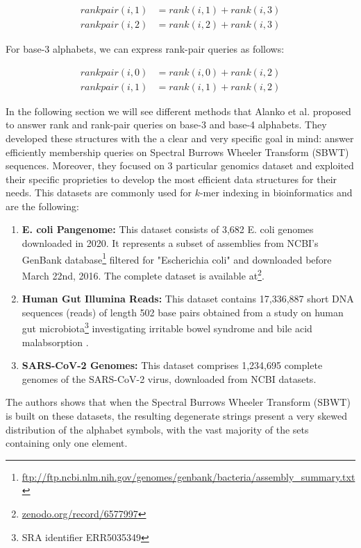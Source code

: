 \begin{align}
    rankpair(i,1) & = rank(i,1) + rank(i,3) \\
    rankpair(i,2) & = rank(i,2) + rank(i,3)
\end{align}

\noindent For base-3 alphabets, we can express rank-pair queries as follows:

\begin{align}
    rankpair(i,0) & = rank(i,0) + rank(i,2) \\
    rankpair(i,1) & = rank(i,1) + rank(i,2)
\end{align}

\noindent In the following section we will see different methods that Alanko et al. \cite{SubsetWT} proposed to answer rank and rank-pair queries on base-3 and base-4 alphabets. They developed these structures with the a clear and very specific goal in mind: answer efficiently membership queries on Spectral Burrows Wheeler Transform (SBWT) sequences. Moreover, they focused on 3 particular genomics dataset and exploited their specific proprieties to develop the most efficient data structures for their needs. This datasets are commonly used for $k$-mer indexing in bioinformatics and are the following:

\begin{enumerate} \label{datasets}
    \item \textbf{E. coli Pangenome:} This dataset consists of 3,682 E. coli genomes downloaded in 2020. It represents a subset of assemblies from NCBI's GenBank database\footnote{\url{ftp://ftp.ncbi.nlm.nih.gov/genomes/genbank/bacteria/assembly\_summary.txt}} filtered for "Escherichia coli" and downloaded before March 22nd, 2016. The complete dataset is available at\footnote{\url{zenodo.org/record/6577997}}.
    \item \textbf{Human Gut Illumina Reads:} This dataset contains 17,336,887 short DNA sequences (reads) of length 502 base pairs obtained from a study on human gut microbiota\footnote{SRA identifier ERR5035349} investigating irritable bowel syndrome and bile acid malabsorption \cite{jeffery2020differences}.
    \item \textbf{SARS-CoV-2 Genomes:} This dataset comprises 1,234,695 complete genomes of the SARS-CoV-2 virus, downloaded from NCBI datasets.
\end{enumerate}

\noindent The authors shows that when the Spectral Burrows Wheeler Transform (SBWT) is built on these datasets, the resulting degenerate strings present a very skewed distribution of the alphabet symbols, with the vast majority of the sets containing only one element.


